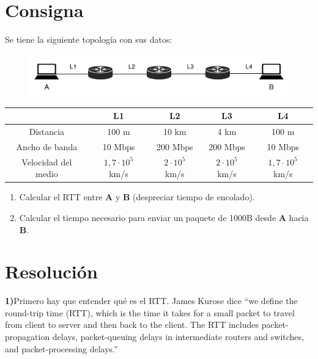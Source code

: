 \section*{Consigna}

Se tiene la siguiente topología con sus datos:

\begin{figure}[H]
    \centering
    \includegraphics[width=0.9\linewidth]{Images/topologia.png}
\end{figure}

\vspace{-5mm}
{
\renewcommand{\arraystretch}{1.5}
\begin{table}[H]
    \centering
    \begin{tabular}{|c|c|c|c|c|}
    \hline
     & L1 & L2 & L3 & L4 \\ \hline
    Distancia & 100 m & 10 km & 4 km & 100 m \\ \hline
    Ancho de banda & 10 Mbps & 200 Mbps & 200 Mbps & 10 Mbps \\ \hline
    Velocidad del medio & $1,7\cdot 10^5$ km/s & $2\cdot 10^5$ km/s & $2\cdot 10^5$ km/s & $1,7\cdot 10^5$ km/s  \\ \hline
    \end{tabular}
\end{table}
}



\begin{enumerate}
    \item Calcular el RTT entre \textbf{A} y \textbf{B} (despreciar tiempo de encolado).
    \item Calcular el tiempo necesario para enviar un paquete de 1000B desde \textbf{A} hacia \textbf{B}.
\end{enumerate}

\section*{Resolución}

\noindent
\textbf{1)}\tab Primero hay que entender qué es el RTT. James Kurose dice ``we define the round-trip time (RTT), which is the time it takes for a small packet to travel from client to server and then back to the client. The RTT includes packet-propagation delays, packet-queuing delays in intermediate routers and switches, and packet-processing delays.''


